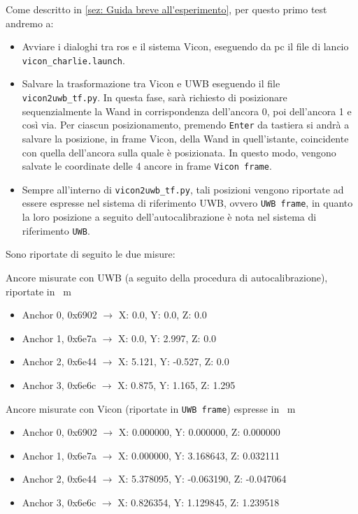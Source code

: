 Come descritto in \ref{sez: Guida breve all'esperimento}, per questo primo test andremo a:
\begin{itemize}
	\item Avviare i dialoghi tra ros e il sistema Vicon, eseguendo da pc il file di lancio \verb|vicon_charlie.launch|.
	\item Salvare la trasformazione tra Vicon e UWB eseguendo il file \verb|vicon2uwb_tf.py|. In questa fase, sarà richiesto di posizionare sequenzialmente la Wand 
	in corrispondenza dell'ancora 0, poi dell'ancora 1 e così via. Per ciascun posizionamento, premendo \verb|Enter| da tastiera si andrà a salvare la posizione, in 
	frame Vicon, della Wand in quell'istante, coincidente con quella dell'ancora sulla quale è posizionata. In questo modo, vengono salvate le coordinate delle 4 ancore in frame \verb|Vicon frame|.
	\item Sempre all'interno di \verb|vicon2uwb_tf.py|, tali posizioni vengono riportate ad essere espresse nel sistema di riferimento UWB, ovvero \verb|UWB frame|, 
	in quanto la loro posizione a seguito dell'autocalibrazione è nota nel sistema di riferimento \verb|UWB|.
\end{itemize}

Sono riportate di seguito le due misure:

Ancore misurate con UWB (a seguito della procedura di autocalibrazione), riportate in \SI{}{\metre}
\begin{itemize}
	\item Anchor 0, 0x6902 $\rightarrow$ X: 0.0, 	Y: 0.0, 	Z: 0.0
	\item Anchor 1, 0x6e7a $\rightarrow$ X: 0.0, 	Y: 2.997, 	Z: 0.0
	\item Anchor 2, 0x6e44 $\rightarrow$ X: 5.121, Y: -0.527, 	Z: 0.0
	\item Anchor 3, 0x6e6c $\rightarrow$ X: 0.875,	Y: 1.165, 	Z: 1.295
\end{itemize}

Ancore misurate con Vicon (riportate in \verb|UWB frame|) espresse in \SI{}{\metre}
\begin{itemize}
	\item Anchor 0, 0x6902 $\rightarrow$ X: 0.000000,	Y: 0.000000,	Z: 0.000000
	\item Anchor 1, 0x6e7a $\rightarrow$ X: 0.000000,	Y: 3.168643,	Z: 0.032111
	\item Anchor 2, 0x6e44 $\rightarrow$ X: 5.378095,	Y: -0.063190,	Z: -0.047064
	\item Anchor 3, 0x6e6c $\rightarrow$ X: 0.826354,	Y: 1.129845,	Z: 1.239518
\end{itemize}


